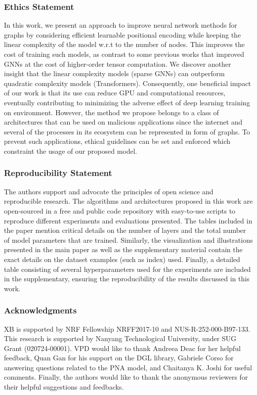 \documentclass{article} \usepackage{iclr2021_conference,times}
\begin{document}
\subsubsection*{Ethics Statement}
In this work, we present an approach to improve neural network methods for graphs by considering efficient learnable positional encoding while keeping the linear complexity of the model w.r.t to the number of nodes. This improves the cost of training such models, as contrast to some previous works that improved GNNs at the cost of higher-order tensor computation. We discover another insight that the linear complexity models (sparse GNNs) can outperform quadratic complexity models (Transformers). Consequently, one beneficial impact of our work is that its use can reduce GPU and computational resources, eventually contributing to minimizing the adverse effect of deep learning training on environment. However, the method we propose belongs to a class of architectures that can be used on malicious applications since the internet and several of the processes in its ecosystem can be represented in form of graphs. To prevent such applications, ethical guidelines can be set and enforced which constraint the usage of our proposed model.




\subsubsection*{Reproducibility Statement}

The authors support and advocate the principles of open science and reproducible research. The algorithms and architectures proposed in this work are open-sourced in a free and public code repository with easy-to-use scripts to reproduce different experiments and evaluations presented. The tables included in the paper mention critical details on the number of layers and the total number of model parameters that are trained. Similarly, the visualization and illustrations presented in the main paper as well as the supplementary material contain the exact details on the dataset examples (such as index) used. Finally, a detailed table consisting of several hyperparameters used for the experiments are included in the supplementary, ensuring the reproducibility of the results discussed in this work. 








\subsubsection*{Acknowledgments}
XB is supported by NRF Fellowship NRFF2017-10 and NUS-R-252-000-B97-133. This research is supported by Nanyang Technological University, under SUG Grant (020724-00001). VPD would like to thank Andreea Deac for her helpful feedback, Quan Gan for his support on the DGL library, Gabriele Corso for answering questions related to the PNA model, and Chaitanya K. Joshi for useful comments. Finally, the authors would like to thank the anonymous reviewers for their helpful suggestions and feedbacks.
\end{document}
